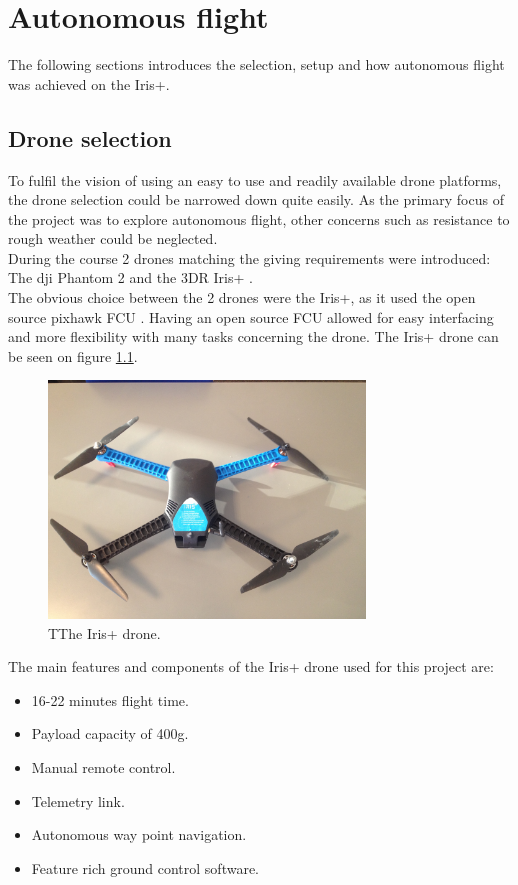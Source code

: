 \chapter{Autonomous flight}
The following sections introduces the selection, setup and how autonomous flight was achieved on the Iris+.

\section{Drone selection}
To fulfil the vision of using an easy to use and readily available drone platforms, the drone selection could be narrowed down quite easily. As the primary focus of the  project was to explore autonomous flight, other concerns such as resistance to rough weather could be neglected. \\
During the course 2 drones matching the giving requirements were introduced: The dji Phantom 2 \cite{Ref:dji} and the 3DR Iris+ \cite{Ref:3dr}.\\
The obvious choice between the 2 drones were the Iris+, as it used the open source pixhawk FCU \cite{Ref:px4}. Having an open source FCU allowed for easy interfacing and more flexibility with many tasks concerning the drone. The Iris+ drone can be seen on figure \ref{fig:iris}.\\

\begin{figure}[H]
  \centering
    \includegraphics[width=0.75\textwidth]{./Images/iris}
  \caption{TThe Iris+ drone.}
  \label{fig:iris}
\end{figure}

\newpage

The main features and components of the Iris+ drone used for this project are:
\begin{itemize}
\item 16-22 minutes flight time.
\item Payload capacity of 400g.
\item Manual remote control.
\item Telemetry link.
\item Autonomous way point navigation.
\item Feature rich ground control software.
\end{itemize}




